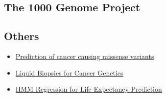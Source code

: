 \documentclass[15pt]{article}
\begin{document}
\subsection{The 1000 Genome Project}
\subsection{Others}
\begin{itemize}
\item \href{https://www.ncbi.nlm.nih.gov/pubmed/21763417}{Prediction of cancer causing missense variants}
\item \href{https://www.nature.com/articles/nrclinonc.2013.110.pdf}{Liquid Biopsies for Cancer Genetics}
\item \href{http://citeseerx.ist.psu.edu/viewdoc/download;jsessionid=379A5ECA015A0475240A921B9FF1A0AD?doi=10.1.1.78.4479&rep=rep1&type=pdf}{HMM Regression for Life Expectancy Prediction }
\end{itemize}
\end{document}
